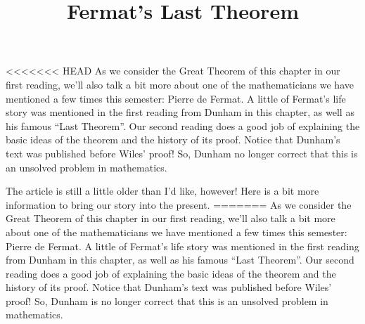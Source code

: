 \documentclass[nooutcomes]{ximera}
\title{Fermat's Last Theorem}
\begin{document}
\begin{abstract}
    
\end{abstract}
\maketitle

<<<<<<< HEAD
As we consider the Great Theorem of this chapter in our first reading,
we'll also talk a bit more about one of the mathematicians we have
mentioned a few times this semester: Pierre de Fermat.  A little of
Fermat's life story was mentioned in the first reading from Dunham in
this chapter, as well as his famous ``Last Theorem''.  Our second
reading does a good job of explaining the basic ideas of the theorem
and the history of its proof.  Notice that Dunham's text was published
before Wiles' proof!  So, Dunham no longer correct that this is an
unsolved problem in mathematics.

The article is still a little older than I'd like, however!  Here is a
bit more information to bring our story into the present.
=======
As we consider the Great Theorem of this chapter in our first reading, we'll also talk a bit more about one of the mathematicians we have mentioned a few times this semester: Pierre de Fermat.  A little of Fermat's life story was mentioned in the first reading from Dunham in this chapter, as well as his famous ``Last Theorem''.  Our second reading does a good job of explaining the basic ideas of the theorem and the history of its proof.  Notice that Dunham's text was published before Wiles' proof!  So, Dunham is no longer correct that this is an unsolved problem in mathematics.
\end{document}
